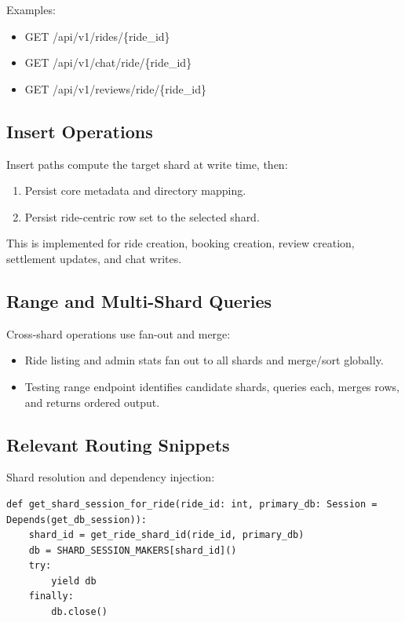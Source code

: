 \documentclass[12pt]{article}
\begin{document}
Examples:
\begin{itemize}
    \item GET /api/v1/rides/\{ride\_id\}
    \item GET /api/v1/chat/ride/\{ride\_id\}
    \item GET /api/v1/reviews/ride/\{ride\_id\}
\end{itemize}

\subsection{Insert Operations}

Insert paths compute the target shard at write time, then:
\begin{enumerate}
    \item Persist core metadata and directory mapping.
    \item Persist ride-centric row set to the selected shard.
\end{enumerate}

This is implemented for ride creation, booking creation, review creation, settlement updates, and chat writes.

\subsection{Range and Multi-Shard Queries}

Cross-shard operations use fan-out and merge:
\begin{itemize}
    \item Ride listing and admin stats fan out to all shards and merge/sort globally.
    \item Testing range endpoint identifies candidate shards, queries each, merges rows, and returns ordered output.
\end{itemize}

\subsection{Relevant Routing Snippets}

Shard resolution and dependency injection:

\begin{verbatim}
def get_shard_session_for_ride(ride_id: int, primary_db: Session = Depends(get_db_session)):
    shard_id = get_ride_shard_id(ride_id, primary_db)
    db = SHARD_SESSION_MAKERS[shard_id]()
    try:
        yield db
    finally:
        db.close()
\end{verbatim}
\end{document}
